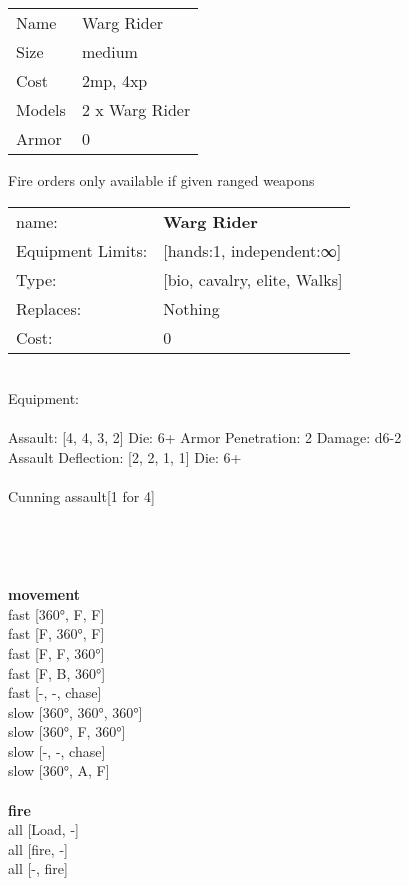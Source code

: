 \begin{tabular}{ll}
  Name & Warg Rider \\
  Size & medium\\
  Cost & 2mp, 4xp\\
  Models & 2 x Warg Rider\\
  Armor & 0\\
\end{tabular}

\noindent Fire orders only available if given ranged weapons\\ 


\noindent
\begin{tabular}{ll}
name: &{\bf Warg Rider } \\
Equipment Limits: &[hands:1, independent:∞] \\
Type: &[bio, cavalry, elite, Walks] \\
Replaces: &Nothing \\
Cost: & 0\\
\end{tabular}
\ \\
Equipment:  \\
\ \\
Assault: [4, 4, 3, 2] Die: 6+ Armor Penetration: 2 Damage: d6-2 \\
Assault Deflection: [2, 2, 1, 1] Die: 6+\\
\\ 
Cunning assault[1 for 4]\\ 
 
\ \\

\ \\
 
\ \\



\ \\ {\bf movement } \\
fast [360°, F, F] \\
fast [F, 360°, F] \\
fast [F, F, 360°] \\
fast [F, B, 360°] \\
fast [-, -, chase] \\
slow [360°, 360°, 360°] \\
slow [360°, F, 360°] \\
slow [-, -, chase] \\
slow [360°, A, F] \\
\ \\ {\bf fire } \\
all [Load, -] \\
all [fire, -] \\
all [-, fire] \\


